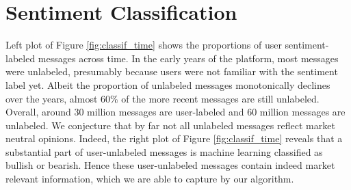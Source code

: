 



\section{Sentiment Classification}\label{S:classification}

Left plot of Figure \ref{fig:classif_time} shows the proportions of user sentiment-labeled messages across time. In the early years of the platform, most messages were unlabeled, presumably because users were not familiar with the sentiment label yet. Albeit the proportion of unlabeled messages monotonically declines over the years, almost 60\% of the more recent messages are still unlabeled. Overall, around 30 million messages are user-labeled and 60 million messages are unlabeled. We conjecture that by far not all unlabeled messages reflect market neutral opinions. Indeed, the right plot of Figure \ref{fig:classif_time} reveals that a substantial part of user-unlabeled messages is machine learning classified as bullish or bearish. Hence these user-unlabeled messages contain indeed market relevant information, which we are able to capture by our algorithm. 


